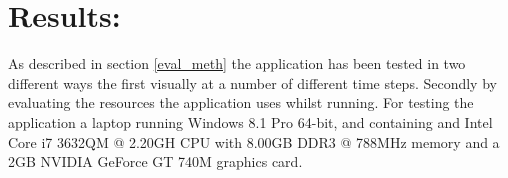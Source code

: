 \clearpage
\section{Results:}
\label{sec:results}

As described in section \ref{eval_meth} the application has been tested in two different ways the first visually at a number of different time steps.
Secondly by evaluating the resources the application uses whilst running.
For testing the application a laptop running Windows 8.1 Pro 64-bit, and containing and Intel Core i7 3632QM @ 2.20GH CPU with 8.00GB DDR3 @ 788MHz memory and a 2GB NVIDIA GeForce GT 740M graphics card.


